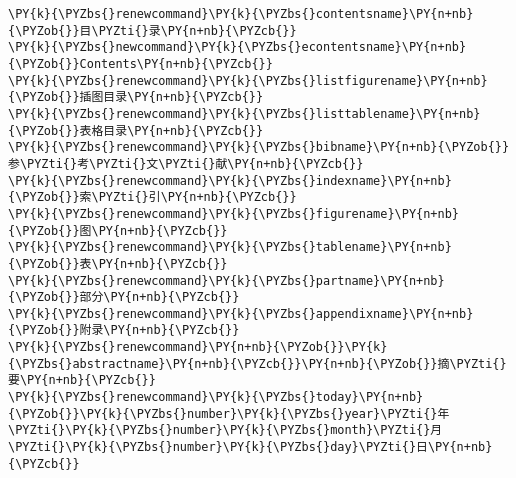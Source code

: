 \begin{Verbatim}[commandchars=\\\{\}]
\PY{k}{\PYZbs{}renewcommand}\PY{k}{\PYZbs{}contentsname}\PY{n+nb}{\PYZob{}}目\PYZti{}录\PY{n+nb}{\PYZcb{}}
\PY{k}{\PYZbs{}newcommand}\PY{k}{\PYZbs{}econtentsname}\PY{n+nb}{\PYZob{}}Contents\PY{n+nb}{\PYZcb{}}
\PY{k}{\PYZbs{}renewcommand}\PY{k}{\PYZbs{}listfigurename}\PY{n+nb}{\PYZob{}}插图目录\PY{n+nb}{\PYZcb{}}
\PY{k}{\PYZbs{}renewcommand}\PY{k}{\PYZbs{}listtablename}\PY{n+nb}{\PYZob{}}表格目录\PY{n+nb}{\PYZcb{}}
\PY{k}{\PYZbs{}renewcommand}\PY{k}{\PYZbs{}bibname}\PY{n+nb}{\PYZob{}}参\PYZti{}考\PYZti{}文\PYZti{}献\PY{n+nb}{\PYZcb{}}
\PY{k}{\PYZbs{}renewcommand}\PY{k}{\PYZbs{}indexname}\PY{n+nb}{\PYZob{}}索\PYZti{}引\PY{n+nb}{\PYZcb{}}
\PY{k}{\PYZbs{}renewcommand}\PY{k}{\PYZbs{}figurename}\PY{n+nb}{\PYZob{}}图\PY{n+nb}{\PYZcb{}}
\PY{k}{\PYZbs{}renewcommand}\PY{k}{\PYZbs{}tablename}\PY{n+nb}{\PYZob{}}表\PY{n+nb}{\PYZcb{}}
\PY{k}{\PYZbs{}renewcommand}\PY{k}{\PYZbs{}partname}\PY{n+nb}{\PYZob{}}部分\PY{n+nb}{\PYZcb{}}
\PY{k}{\PYZbs{}renewcommand}\PY{k}{\PYZbs{}appendixname}\PY{n+nb}{\PYZob{}}附录\PY{n+nb}{\PYZcb{}}
\PY{k}{\PYZbs{}renewcommand}\PY{n+nb}{\PYZob{}}\PY{k}{\PYZbs{}abstractname}\PY{n+nb}{\PYZcb{}}\PY{n+nb}{\PYZob{}}摘\PYZti{}要\PY{n+nb}{\PYZcb{}}
\PY{k}{\PYZbs{}renewcommand}\PY{k}{\PYZbs{}today}\PY{n+nb}{\PYZob{}}\PY{k}{\PYZbs{}number}\PY{k}{\PYZbs{}year}\PYZti{}年\PYZti{}\PY{k}{\PYZbs{}number}\PY{k}{\PYZbs{}month}\PYZti{}月\PYZti{}\PY{k}{\PYZbs{}number}\PY{k}{\PYZbs{}day}\PYZti{}日\PY{n+nb}{\PYZcb{}}
\end{Verbatim}
